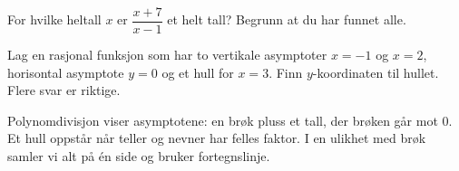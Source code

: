 For hvilke heltall $x$ er $\dfrac{x+7}{x-1}$ et helt tall? Begrunn at du har funnet alle.

Lag en rasjonal funksjon som har to vertikale asymptoter $x = -1$ og $x = 2$, horisontal asymptote $y = 0$ og et hull for $x = 3$.
Finn $y$-koordinaten til hullet. Flere svar er riktige.

\begin{oppsummering}
Polynomdivisjon viser asymptotene: en brøk pluss et tall, der brøken går mot 0.
Et hull oppstår når teller og nevner har felles faktor.
I en ulikhet med brøk samler vi alt på én side og bruker fortegnslinje.
\end{oppsummering}
